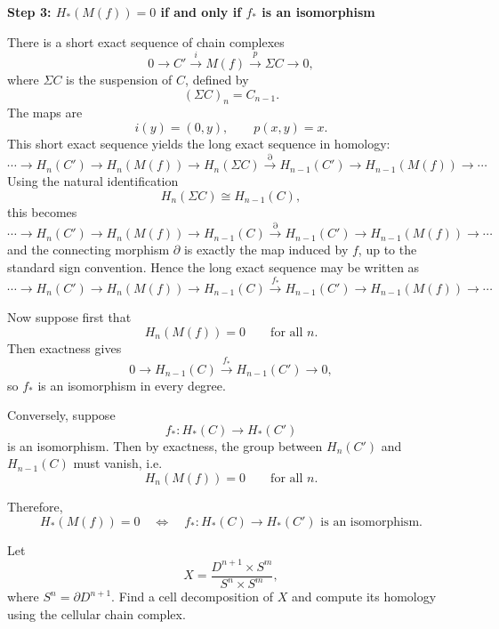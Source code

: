 \begin{solution}
\medskip
\noindent\textbf{Step 3: \(H_*(M(f))=0\) if and only if \(f_*\) is an isomorphism}\par
\smallskip


There is a short exact sequence of chain complexes
\[
0\longrightarrow C' \xrightarrow{i} M(f)\xrightarrow{p} \Sigma C \longrightarrow 0,
\]
where \(\Sigma C\) is the suspension of \(C\), defined by
\[
(\Sigma C)_n=C_{n-1}.
\]
The maps are
\[
i(y)=(0,y),\qquad p(x,y)=x.
\]
This short exact sequence yields the long exact sequence in homology:
\[
\cdots
\to H_n(C')
\to H_n(M(f))
\to H_n(\Sigma C)
\xrightarrow{\partial}
H_{n-1}(C')
\to H_{n-1}(M(f))
\to \cdots
\]
Using the natural identification
\[
H_n(\Sigma C)\cong H_{n-1}(C),
\]
this becomes
\[
\cdots
\to H_n(C')
\to H_n(M(f))
\to H_{n-1}(C)
\xrightarrow{\partial}
H_{n-1}(C')
\to H_{n-1}(M(f))
\to \cdots
\]
and the connecting morphism \(\partial\) is exactly the map induced by \(f\), up to the standard sign convention. Hence the long exact sequence may be written as
\[
\cdots
\to H_n(C')
\to H_n(M(f))
\to H_{n-1}(C)
\xrightarrow{f_*}
H_{n-1}(C')
\to H_{n-1}(M(f))
\to \cdots
\]

Now suppose first that
\[
H_n(M(f))=0
\qquad\text{for all }n.
\]
Then exactness gives
\[
0\to H_{n-1}(C)\xrightarrow{f_*} H_{n-1}(C')\to 0,
\]
so \(f_*\) is an isomorphism in every degree.

Conversely, suppose
\[
f_*:H_*(C)\to H_*(C')
\]
is an isomorphism. Then by exactness, the group between \(H_n(C')\) and \(H_{n-1}(C)\) must vanish, i.e.
\[
H_n(M(f))=0
\qquad\text{for all }n.
\]

Therefore,
\[
H_*(M(f))=0
\quad\Longleftrightarrow\quad
f_*:H_*(C)\to H_*(C')
\text{ is an isomorphism.}
\]

\par
\end{solution}

\begin{problem}
Let
\[
X=\frac{D^{n+1}\times S^m}{S^n\times S^m},
\]
where \(S^n=\partial D^{n+1}\). Find a cell decomposition of \(X\) and compute its homology using the cellular chain complex.
\end{problem}

